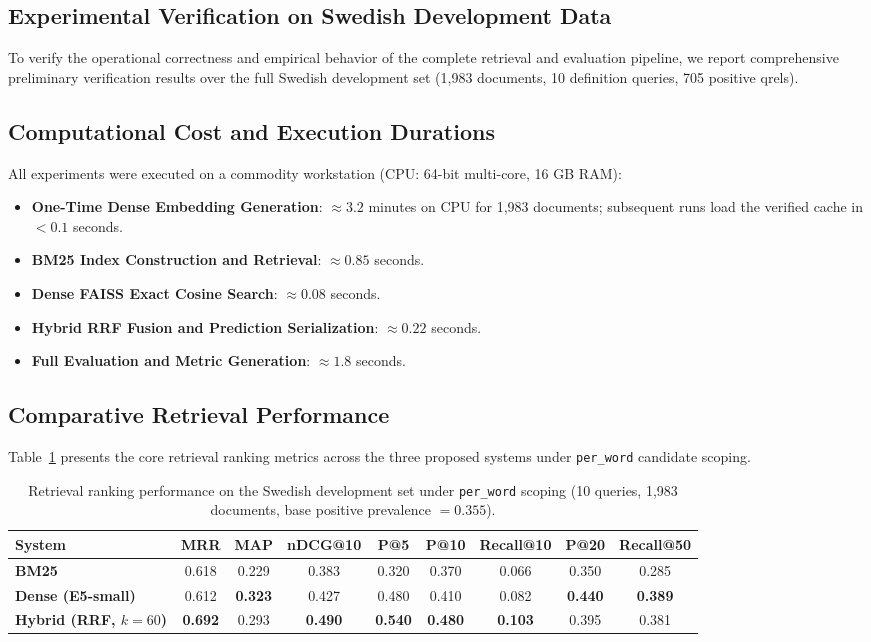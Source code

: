 \subsection{Experimental Verification on Swedish Development Data}
To verify the operational correctness and empirical behavior of the complete retrieval and evaluation pipeline, we report comprehensive preliminary verification results over the full Swedish development set (1,983 documents, 10 definition queries, 705 positive qrels).

\subsection{Computational Cost and Execution Durations}
All experiments were executed on a commodity workstation (CPU: 64-bit multi-core, 16 GB RAM):
\begin{itemize}
    \item \textbf{One-Time Dense Embedding Generation}: $\approx 3.2$ minutes on CPU for 1,983 documents; subsequent runs load the verified cache in $< 0.1$ seconds.
    \item \textbf{BM25 Index Construction and Retrieval}: $\approx 0.85$ seconds.
    \item \textbf{Dense FAISS Exact Cosine Search}: $\approx 0.08$ seconds.
    \item \textbf{Hybrid RRF Fusion and Prediction Serialization}: $\approx 0.22$ seconds.
    \item \textbf{Full Evaluation and Metric Generation}: $\approx 1.8$ seconds.
\end{itemize}

\subsection{Comparative Retrieval Performance}
Table~\ref{tab:retrieval_metrics} presents the core retrieval ranking metrics across the three proposed systems under \texttt{per\_word} candidate scoping.

\begin{table}[H]
\centering
\small
\begin{tabular}{lcccccccc}
\toprule
\textbf{System} & \textbf{MRR} & \textbf{MAP} & \textbf{nDCG@10} & \textbf{P@5} & \textbf{P@10} & \textbf{Recall@10} & \textbf{P@20} & \textbf{Recall@50} \\
\midrule
\textbf{BM25} & 0.618 & 0.229 & 0.383 & 0.320 & 0.370 & 0.066 & 0.350 & 0.285 \\
\textbf{Dense (E5-small)} & 0.612 & \textbf{0.323} & 0.427 & 0.480 & 0.410 & 0.082 & \textbf{0.440} & \textbf{0.389} \\
\textbf{Hybrid (RRF, $k=60$)} & \textbf{0.692} & 0.293 & \textbf{0.490} & \textbf{0.540} & \textbf{0.480} & \textbf{0.103} & 0.395 & 0.381 \\
\bottomrule
\end{tabular}
\caption{Retrieval ranking performance on the Swedish development set under \texttt{per\_word} scoping (10 queries, 1,983 documents, base positive prevalence $= 0.355$).}
\label{tab:retrieval_metrics}
\end{table}

